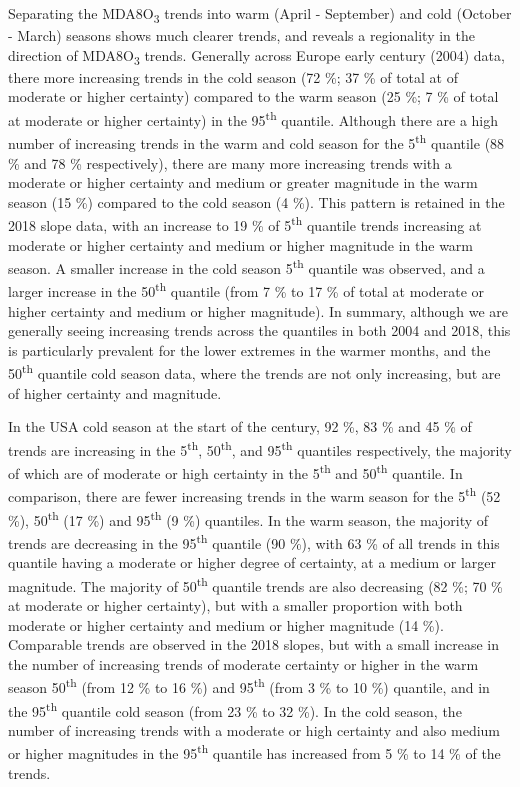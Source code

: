\documentclass[journal abbreviation, manuscript]{copernicus}
\begin{document}
Separating the MDA8O\textsubscript{3} trends into warm (April - September) and cold (October - March) seasons shows much clearer trends, and reveals a regionality in the direction of MDA8O\textsubscript{3} trends. Generally across Europe early century (2004) data, there more increasing trends in the cold season (72 \%; 37 \% of total at of moderate or higher certainty) compared to the warm season (25 \%; 7 \% of total at moderate or higher certainty) in the 95\textsuperscript{th} quantile. Although there are a high number of increasing trends in the warm and cold season for the 5\textsuperscript{th} quantile (88 \% and 78 \% respectively), there are many more increasing trends with a moderate or higher certainty and medium or greater magnitude in the warm season (15 \%) compared to the cold season (4 \%). This pattern is retained in the 2018 slope data, with an increase to 19 \% of 5\textsuperscript{th} quantile trends increasing at moderate or higher certainty and medium or higher magnitude in the warm season. A smaller increase in the cold season 5\textsuperscript{th} quantile was observed, and a larger increase in the 50\textsuperscript{th} quantile (from 7 \% to 17 \% of total at moderate or higher certainty and medium or higher magnitude). In summary, although we are generally seeing increasing trends across the quantiles in both 2004 and 2018, this is particularly prevalent for the lower extremes in the warmer months, and the 50\textsuperscript{th} quantile cold season data, where the trends are not only increasing, but are of higher certainty and magnitude.

In the USA cold season at the start of the century, 92 \%, 83 \% and 45 \% of trends are increasing in the 5\textsuperscript{th}, 50\textsuperscript{th}, and 95\textsuperscript{th} quantiles respectively, the majority of which are of moderate or high certainty in the 5\textsuperscript{th} and 50\textsuperscript{th} quantile. In comparison, there are fewer increasing trends in the warm season for the 5\textsuperscript{th} (52 \%), 50\textsuperscript{th} (17 \%) and 95\textsuperscript{th} (9 \%) quantiles. In the warm season, the majority of trends are decreasing in the 95\textsuperscript{th} quantile (90 \%), with 63 \% of all trends in this quantile having a moderate or higher degree of certainty, at a medium or larger magnitude. The majority of 50\textsuperscript{th} quantile trends are also decreasing (82 \%; 70 \% at moderate or higher certainty), but with a smaller proportion with both moderate or higher certainty and medium or higher magnitude (14 \%). Comparable trends are observed in the 2018 slopes, but with a small increase in the number of increasing trends of moderate certainty or higher in the warm season 50\textsuperscript{th} (from 12 \% to 16 \%) and 95\textsuperscript{th} (from 3 \% to 10 \%) quantile, and in the 95\textsuperscript{th} quantile cold season (from 23 \% to 32 \%). In the cold season, the number of increasing trends with a moderate or high certainty and also medium or higher magnitudes in the 95\textsuperscript{th} quantile has increased from 5 \% to 14 \% of the trends.
\end{document}
